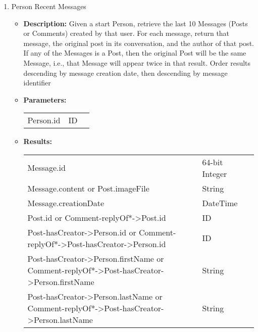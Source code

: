 \begin{enumerate}
  \item Person Recent Messages
    \begin{itemize}
      \item \textbf{Description:}
        Given a start Person, retrieve the last 10 Messages (Posts or Comments) created by that user.
        For each message, return that message, the original post in its conversation, and the author of that post.
        If any of the Messages is a Post, then the original Post will be the same Message, i.e., that Message will appear twice in that result.
        Order results descending by message creation date, then descending by message identifier
      \item \textbf{Parameters:} \\
        \begin{tabular}{lll}
          Person.id 										& ID \\
        \end{tabular}
      \item \textbf{Results:} \\
        \begin{tabular}{lll}
          Message.id     									& 64-bit Integer \\
          Message.content or Post.imageFile										& String \\
          Message.creationDate  & DateTime \\
          Post.id or Comment-replyOf*->Post.id								& ID \\
          Post-hasCreator->Person.id or Comment-replyOf*->Post-hasCreator->Person.id & ID \\
          Post-hasCreator->Person.firstName or Comment-replyOf*->Post-hasCreator->Person.firstName & String \\
          Post-hasCreator->Person.lastName or Comment-replyOf*->Post-hasCreator->Person.lastName & String \\
        \end{tabular}
    \end{itemize}


\end{enumerate}
